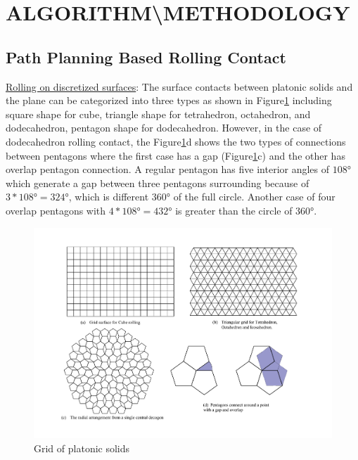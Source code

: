 \section{ALGORITHM\textbackslash METHODOLOGY}

\subsection{Path Planning Based Rolling Contact}
\noindent\uline{Rolling on discretized surfaces}:
The surface contacts between platonic solids and the plane can be categorized into three types as shown in Figure\ref{fig:gridPlatonic} including square shape for cube, triangle shape for tetrahedron, octahedron, and dodecahedron, pentagon shape for dodecahedron. However, in the case of dodecahedron rolling contact, the Figure\ref{fig:gridPlatonic}d shows the two types of connections between pentagons where the first case has a gap (Figure\ref{fig:gridPlatonic}c) and the other has overlap pentagon connection. A regular pentagon has five interior angles of $\ang{108}$ which generate a gap between three pentagons surrounding because of $3*\ang{108}=\ang{324}$, which is different $\ang{360}$ of the full circle. Another case of four overlap pentagons with $4*\ang{108}=\ang{432}$ is greater than the circle of $\ang{360}$.
%
\begin{figure}[h]
\centering
	\includegraphics[width=1\textwidth]{image/gridPlatonic.pdf}
	\caption{Grid of platonic solids}
	\label{fig:gridPlatonic}
\end{figure}
%
%

